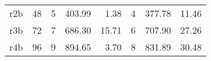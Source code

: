 \begin{table}[]
\begin{tabular}{cl|lll|lll}
r2b                        & \multicolumn{1}{r|}{48}  & \multicolumn{1}{r}{5} & \multicolumn{1}{r}{403.99} & \multicolumn{1}{r|}{1.38}  & \multicolumn{1}{r}{4} & \multicolumn{1}{r}{377.78} & \multicolumn{1}{r}{11.46}  \\
r3b                           & \multicolumn{1}{r|}{72}  & \multicolumn{1}{r}{7} & \multicolumn{1}{r}{686.30} & \multicolumn{1}{r|}{15.71}  & \multicolumn{1}{r}{6} & \multicolumn{1}{r}{707.90} & \multicolumn{1}{r}{27.26}  \\
r4b                         & \multicolumn{1}{r|}{96}  & \multicolumn{1}{r}{9} & \multicolumn{1}{r}{894.65} & \multicolumn{1}{r|}{3.70}  & \multicolumn{1}{r}{8} & \multicolumn{1}{r}{831.89} & \multicolumn{1}{r}{30.48}  \\ \hline
\end{tabular}
\end{table}




%
